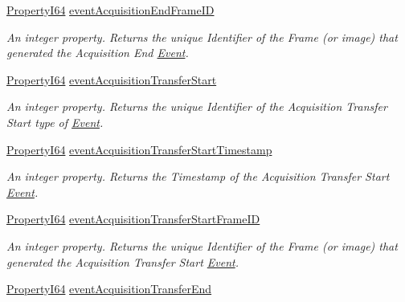 \begin{DoxyCompactItemize}
\hyperlink{group___common_interface_ga81749b2696755513663492664a18a893}{Property\+I64} \hyperlink{classmv_i_m_p_a_c_t_1_1acquire_1_1_gen_i_cam_1_1_event_control_a4349a6a7793080c79248127a1b1669cc}{event\+Acquisition\+End\+Frame\+I\+D}
\begin{DoxyCompactList}\small\item\em An integer property. Returns the unique Identifier of the Frame (or image) that generated the Acquisition End \hyperlink{classmv_i_m_p_a_c_t_1_1acquire_1_1_event}{Event}. \end{DoxyCompactList}\item 
\hyperlink{group___common_interface_ga81749b2696755513663492664a18a893}{Property\+I64} \hyperlink{classmv_i_m_p_a_c_t_1_1acquire_1_1_gen_i_cam_1_1_event_control_a23077eda757aa2b93dbe696973b4850b}{event\+Acquisition\+Transfer\+Start}
\begin{DoxyCompactList}\small\item\em An integer property. Returns the unique Identifier of the Acquisition Transfer Start type of \hyperlink{classmv_i_m_p_a_c_t_1_1acquire_1_1_event}{Event}. \end{DoxyCompactList}\item 
\hyperlink{group___common_interface_ga81749b2696755513663492664a18a893}{Property\+I64} \hyperlink{classmv_i_m_p_a_c_t_1_1acquire_1_1_gen_i_cam_1_1_event_control_a7cf72a7244fc03351fa12d6504fc9610}{event\+Acquisition\+Transfer\+Start\+Timestamp}
\begin{DoxyCompactList}\small\item\em An integer property. Returns the Timestamp of the Acquisition Transfer Start \hyperlink{classmv_i_m_p_a_c_t_1_1acquire_1_1_event}{Event}. \end{DoxyCompactList}\item 
\hyperlink{group___common_interface_ga81749b2696755513663492664a18a893}{Property\+I64} \hyperlink{classmv_i_m_p_a_c_t_1_1acquire_1_1_gen_i_cam_1_1_event_control_ac3678d0a09d19a23b0cb8636a1afb372}{event\+Acquisition\+Transfer\+Start\+Frame\+I\+D}
\begin{DoxyCompactList}\small\item\em An integer property. Returns the unique Identifier of the Frame (or image) that generated the Acquisition Transfer Start \hyperlink{classmv_i_m_p_a_c_t_1_1acquire_1_1_event}{Event}. \end{DoxyCompactList}\item 
\hyperlink{group___common_interface_ga81749b2696755513663492664a18a893}{Property\+I64} \hyperlink{classmv_i_m_p_a_c_t_1_1acquire_1_1_gen_i_cam_1_1_event_control_a5c9bcb0aaafaf777fea50314c8a00028}{event\+Acquisition\+Transfer\+End}

\end{DoxyCompactItemize}
